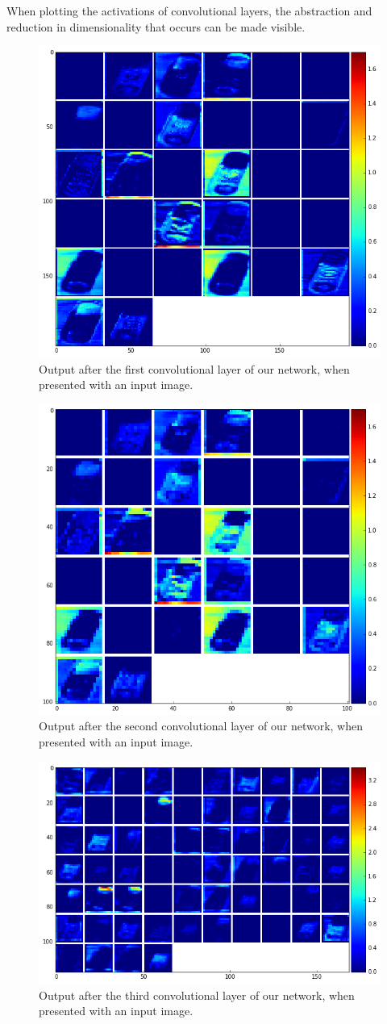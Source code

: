 \documentclass[	DIV=calc,%
				paper=a4,%
				fontsize=11pt,%
				twocolumn]{scrartcl}	 %
\begin{document}
When plotting the activations of convolutional layers, the abstraction and reduction in dimensionality that occurs can be made visible.

\begin{figure}[H]
    \centering
    \includegraphics[width=0.5\linewidth]{data/final_cnn_firstlayer.png}
    \caption{Output after the first convolutional layer of our network, when presented with an input image.}
\end{figure}

\begin{figure}[H]
    \centering
    \includegraphics[width=0.5\linewidth]{data/final_cnn_secondlayer.png}
    \caption{Output after the second convolutional layer of our network, when presented with an input image.}
\end{figure}

\begin{figure}[H]
    \centering
    \includegraphics[width=0.5\linewidth]{data/final_cnn_thirdlayer.png}
    \caption{Output after the third convolutional layer of our network, when presented with an input image.}
\end{figure}
\end{document}
